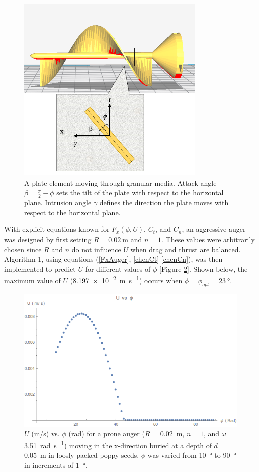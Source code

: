 \documentclass[letterpaper, 11 pt]{article}
\begin{document}
\begin{figure}[H]
\centering
\includegraphics[height=9cm]{./imgs/helix_plate}
\caption{A plate element moving through granular media. Attack angle $\beta = \frac{\pi}{2} - \phi$ sets the tilt of the plate with respect to the horizontal plane. Intrusion angle $\gamma$ defines the direction the plate moves with respect to the horizontal plane. }
\label{fig:helix_plate}
\end{figure}

With explicit equations known for $F_x(\phi,U)$, $C_t$, and $C_n$, an aggressive auger was designed by first setting $R = \SI{0.02}{\m}$ and $n = 1$. These values were arbitrarily chosen since $R$ and $n$ do not influence $U$ when drag and thrust are balanced. Algorithm 1, using equations (\ref{FxAuger}, \ref{chenCt}-\ref{chenCn}), was then implemented to predict $U$ for different values of $\phi$ [Figure \ref{fig:UvPhi}]. Shown below, the maximum value of $U$ (\SI[per-mode=fraction]{8.197e-2}{\m\per\s}) occurs when $\phi = \phi_{opt} = \SI{23}{\degree}$.   
\begin{figure}[H]
\centering
\includegraphics[width=0.7\linewidth]{./imgs/UvPhi}
\caption{$U$ (\si{\m/\s}) vs. $\phi$ (\si{\radian}) for a prone auger ($R$ = \SI{0.02}{\m}, $n = 1$, and $\omega = $ \SI[per-mode=fraction]{3.51}{\radian\per\s}) moving in the x-direction buried at a depth of $d =$ \SI{0.05}{\m} in loosly packed poppy seeds. $\phi$ was varied from \SI{10}{\degree} to \SI{90}{\degree} in increments of \SI{1}{\degree}.}
\label{fig:UvPhi}
\end{figure}
 
\end{document}

